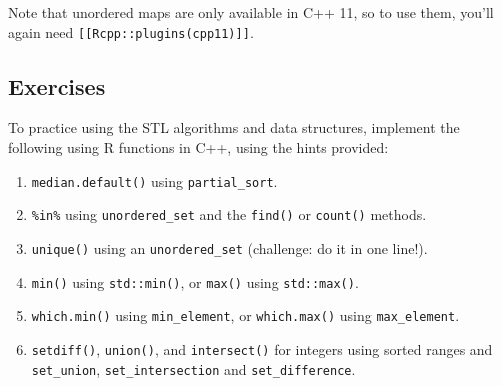 \begin{Shaded}
\begin{Highlighting}[]
  

\NormalTok{, }
  \NormalTok{, }

   
   \NormalTok{(} 
  \NormalTok{\}}

   
\NormalTok{\}}
\end{Highlighting}
\end{Shaded}

Note that unordered maps are only available in C++ 11, so to use them,
you'll again need \texttt{{[}{[}Rcpp::plugins(cpp11){]}{]}}.

\subsection{Exercises}

To practice using the STL algorithms and data structures, implement the
following using R functions in C++, using the hints provided:

\begin{enumerate}
\def\labelenumi{\arabic{enumi}.}
\item
  \texttt{median.default()} using \texttt{partial\_sort}.
\item
  \texttt{\%in\%} using \texttt{unordered\_set} and the \texttt{find()}
  or \texttt{count()} methods.
\item
  \texttt{unique()} using an \texttt{unordered\_set} (challenge: do it
  in one line!).
\item
  \texttt{min()} using \texttt{std::min()}, or \texttt{max()} using
  \texttt{std::max()}.
\item
  \texttt{which.min()} using \texttt{min\_element}, or
  \texttt{which.max()} using \texttt{max\_element}.
\item
  \texttt{setdiff()}, \texttt{union()}, and \texttt{intersect()} for
  integers using sorted ranges and \texttt{set\_union},
  \texttt{set\_intersection} and \texttt{set\_difference}.
\end{enumerate}


